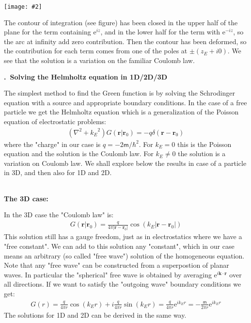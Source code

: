 \documentclass[onecolumn,fleqn, 11pt]{revtex4}
\newcommand{\eexp}{\mathrm{e}^}
\newcommand{\mass}{\mathsf{m}}
\newcommand{\putgraph}[2][0.30\hsize]{\texttt{[image: \#2]}}
\newcommand{\beq}{\begin{eqnarray}}
\newcommand{\eeq}{\end{eqnarray}}
\renewcommand{\thesubsection}{\arabic{subsection}}
\renewcommand{\thesubsubsection}{\arabic{subsubsection}}
\newcommand{\sheadC}[1]
{
\addtocounter{subsubsection}{1}
\vspace{5mm}
{\bf \thesubsection.\thesubsubsection \ #1}  
\nopagebreak
\phantomsection
}
\begin{document}
\begin{center}
\putgraph[0.4\hsize]{GreenComplexIntegral}
\end{center}

The contour of integration (see figure) has been closed 
in the upper half of the plane for the term containing $\eexp{iz}$,  
and in the lower half for the term with $\eexp{-iz}$, 
so the arc at infinity add zero contribution. 
Then the contour has been deformed, so the contribution for 
each term comes from one of the poles at $\pm(z_E+i0)$. 
We see that the solution is a variation on the familiar Coulomb law.





\sheadC{Solving the Helmholtz equation in 1D/2D/3D}


The simplest method to find the Green function 
is by solving the Schrodinger equation with 
a source and appropriate boundary conditions. 
In the case of a free particle we get 
the Helmholtz equation which is a generalization 
of the Poisson equation of electrostatic problems:  
\beq
(\nabla^2 +{k_E}^2)G(\mathbf{r}|\mathbf{r}_0)=
-q\delta(\mathbf{r}-\mathbf{r}_0)
\eeq
where the "charge" in our case is $q=-2\mass/\hbar^2$. 
For $k_E=0$ this is the Poisson equation 
and the solution is the Coulomb law. 
For $k_E\neq0$ the solution is a variation on Coulomb law.
We shall explore below the results in case of 
a particle in 3D, and then also for 1D and 2D.    



\ \\
{\bf The 3D case:}

In the 3D case the "Coulomb law" is:
\beq
G(\mathbf{r}|\mathbf{r}_0)=
\frac{q}{4\pi |\mathbf{r}-\mathbf{r}_0|}\cos(k_E|\mathbf{r}-\mathbf{r}_0|)
\eeq
This solution still has a gauge freedom, just as in electrostatics where 
we have a "free constant". We can add to this solution any "constant", which in our case means 
an arbitrary (so called "free wave") solution of the homogeneous equation. 
Note that any "free wave" can be constructed from a superpostion of planar waves.   
In particular the "spherical" free wave is obtained 
by averaging $\eexp{i\mathbf{k} \cdot \mathbf{r}}$ 
over all directions. If we want to satisfy 
the "outgoing wave" boundary conditions we get:  
\beq
G(r)=\frac{q}{4\pi r}\cos(k_E r)+i\frac{q}{4\pi r}\sin(k_E r)=
\frac{q}{4\pi r}\eexp{ik_Er} = -\frac{\mass}{2\pi r}\eexp{ik_Er}
\eeq
The solutions for 1D and 2D can be derived in the same way.
\end{document}
